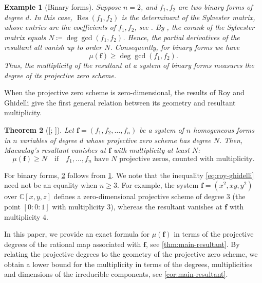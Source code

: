 \documentclass[11pt,letterpaper]{article}
\newtheorem{theorem}{Theorem}[section]
\newtheorem{example}[theorem]{Example}\AddToHook{env/example/begin}{\crefalias{theorem}{example}}
\numberwithin{equation}{section}
\newcommand{\CC}{\mathbb{C}}
\newcommand{\ff}{\ensuremath{\boldsymbol{f}}}
\DeclareMathOperator{\Res}{Res}
\begin{document}
\begin{example}[Binary forms]
\label{ex:bivariate}
Suppose $n=2$, and $
f_1, f_2$ are two binary forms of degree $d$.
In this case, $\Res(f_1,f_2)$ is the determinant of the \emph{Sylvester matrix}, whose entries are the coefficients of $f_1,f_2$, see \cite[Chapter~3,\S 1]{Cox-Little-Oshea-05}.
By \cite[Theorem~1]{Barnett-80}, the corank of the Sylvester matrix equals $N\coloneqq \deg\gcd(f_1,f_2)$.
Hence, the partial derivatives of the resultant all vanish up to order $N$.
Consequently, for binary forms we have \[
\mu(\ff)\geq \deg\gcd(f_1,f_2).
\]
Thus, the multiplicity of the resultant at a system of binary forms measures the degree of its projective zero scheme.
\end{example}

When the projective zero scheme is zero-dimensional, the results of Roy \cite{Roy-13} and Ghidelli \cite{Ghidelli-19} give the first general relation between its geometry and resultant multiplicity.
\begin{theorem}[{[\citealp[Theorem~5.2]{Roy-13};
 \citealp[Theorem~0.1]{Ghidelli-19}]}]
\label{thm:roy-ghidelli}
    Let $\ff=(f_1,f_2,\dots,f_n)$ be a system of $n$ homogeneous forms in $n$ variables of degree $d$ whose projective zero scheme has degree $N$.
    Then, Macaulay's resultant vanishes at $\ff$ with multiplicity at least $N$:\begin{equation}
    \label{eq:roy-ghidelli}
    \mu(\ff)\geq N \quad \text{if} \quad f_1,\dots,f_n \text{ have }N\text{ projective zeros, counted with multiplicity.}
    \end{equation}
\end{theorem}

For binary forms, \cref{thm:roy-ghidelli} follows from \cref{ex:bivariate}. 
We note that the inequality \eqref{eq:roy-ghidelli} need not be an equality when $n\geq 3$.
For example, the system $\ff=(x^2,xy,y^2)$ over $\CC[x,y,z]$ defines a zero-dimensional projective scheme of degree $3$ (the point $[0:0:1]$ with multiplicity $3$), whereas the resultant vanishes at $\ff$ with multiplicity $4$.

In this paper, we provide an exact formula for $\mu(\ff)$ in terms of the projective degrees of the rational map associated with $\ff$, see \cref{thm:main-resultant}. 
By relating the projective degrees to the geometry of the projective zero scheme, we obtain a lower bound for the multiplicity in terms of the degrees, multiplicities and dimensions of the irreducible components, see \cref{cor:main-resultant}.
\end{document}
